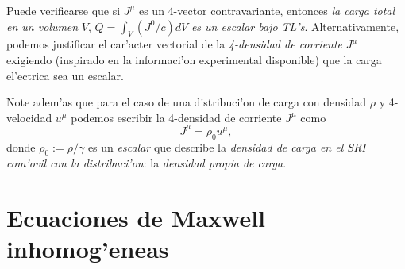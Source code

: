 Puede verificarse que si $J^\mu$ es un 4-vector
contravariante, entonces \textit{la carga total en un volumen} $V$, $Q=\int_V (J^0/c)dV$ \textit{es un escalar bajo TL's}. Alternativamente, podemos justificar el car'acter
vectorial de la \textit{4-densidad de corriente} $J^\mu$ exigiendo (inspirado en la informaci'on experimental disponible) que la carga el'ectrica sea un escalar.

Note adem'as que para el caso de una distribuci'on de carga con densidad $\rho$ y 4-velocidad $u^\mu$ podemos escribir la 4-densidad de corriente $J^\mu$ como
\begin{equation}
\boxed{J^\mu=\rho_0 u^\mu,}
\end{equation}
donde $\rho_0:={\rho}/{\gamma}$ es un \textit{escalar} que describe la \textit{densidad de carga en el SRI com'ovil con la distribuci'on}: la \textit{densidad propia de carga}.


\section{Ecuaciones de Maxwell inhomog'eneas}

